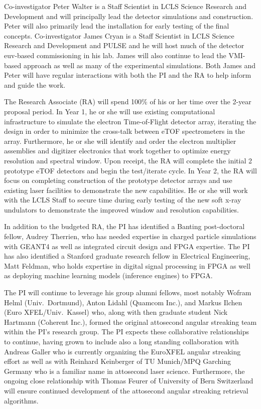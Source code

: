 Co-investigator Peter Walter is a Staff Scientist in LCLS Science Research and Development and will principally lead the detector simulations and construction.
Peter will also primarily lead the installation for early testing of the final concepts.
Co-investigator James Cryan is a Staff Scientist in LCLS Science Research and Development and PULSE and he will host much of the detector euv-based commissioning in his lab.
James will also continue to lead the VMI-based approach as well as many of the experimental simulations.
Both James and Peter will have regular interactions with both the PI and the RA to help inform and guide the work.

The Research Associate (RA) will spend 100\% of his or her time over the 2-year proposal period.  
In Year 1, he or she will use existing computational infrastructure to simulate the electron Time-of-Flight detector array, iterating the design in order to minimize the cross-talk between eTOF spectrometers in the array.  
Furthermore, he or she will identify and order the electron multiplier assemblies and digitizer electronics that work together to optimize energy resolution and spectral window.  
Upon receipt, the RA will complete the initial 2 prototype eTOF detectors and begin the test/iterate cycle.
In Year 2, the RA will focus on completing construction of the prototype detector arrays and use existing laser facilities to demonstrate the new capabilities.  
He or she will work with the LCLS Staff to secure time during early testing of the new soft x-ray undulators to demonstrate the improved window and resolution capabilities.

In addition to the budgeted RA, the PI has identified a Banting post-doctoral fellow, Audrey Therrien, who has needed expertise in charged particle simulations with GEANT4 as well as integrated circuit design and FPGA expertise.
The PI has also identified a Stanford graduate research fellow in Electrical Engineering, Matt Feldman, who holds expertise in digital signal processing in FPGA as well as deploying machine learning models (inference engines) to FPGA.

The PI will continue to leverage his group alumni fellows, most notably Wofram Helml (Univ.~Dortmund), Anton Lidahl (Quamcom Inc.), and Markus Ilchen (Euro XFEL/Univ.~Kassel) who, along with then graduate student Nick Hartmann (Coherent Inc.), formed the original attosecond angular streaking team within the PI's research group.
The PI expects these collaborative relationships to continue, having grown to include also a long standing collaboration with Andreas Galler who is currently organizing the EuroXFEL angular streaking effort as well as with Reinhard Keinberger of TU Munich/MPQ Garching Germany who is a familiar name in attosecond laser science.
Furthermore, the ongoing close relationship with Thomas Feurer of University of Bern Switzerland will ensure continued development of the attosecond angular streaking retrieval algorithms.


